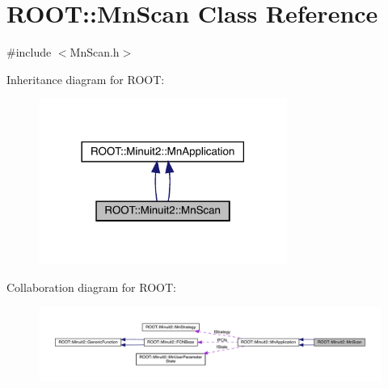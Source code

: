 \hypertarget{classROOT_1_1Minuit2_1_1MnScan}{}\section{R\+O\+OT\+:\+:Mn\+Scan Class Reference}
\label{classROOT_1_1Minuit2_1_1MnScan}


{\ttfamily \#include $<$Mn\+Scan.\+h$>$}



Inheritance diagram for R\+O\+OT\+:\nopagebreak
\begin{figure}[H]
\begin{center}
\leavevmode
\includegraphics[width=230pt]{d3/dcb/classROOT_1_1Minuit2_1_1MnScan__inherit__graph}
\end{center}
\end{figure}


Collaboration diagram for R\+O\+OT\+:\nopagebreak
\begin{figure}[H]
\begin{center}
\leavevmode
\includegraphics[width=350pt]{de/ddf/classROOT_1_1Minuit2_1_1MnScan__coll__graph}
\end{center}
\end{figure}
